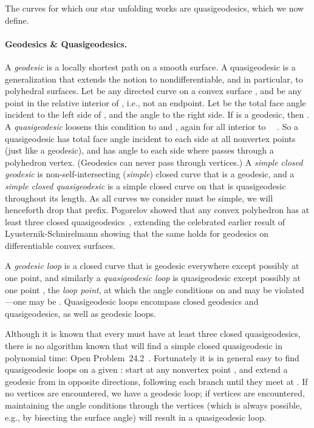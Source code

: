 \pdfoutput=1  \documentclass[]{article}
\begin{document}
The curves  for which our star unfolding works are
quasigeodesics, which we now define.



\paragraph{Geodesics \& Quasigeodesics.}
A \emph{geodesic} is a locally shortest path on a smooth surface.
A quasigeodesic is a generalization that extends the notion to 
nondifferentiable, and in particular, to
polyhedral surfaces.
Let  be any directed curve on a convex surface , 
and  be any point in the relative interior of , i.e., not
an endpoint.
Let  be the total face angle incident to the left side of ,
and  the angle to the right side.
If  is a geodesic, then .
A \emph{quasigeodesic}  loosens this condition to  and ,
again for all  interior to ~\cite[p.~16]{az-igs-67}~\cite[p.~28]{p-egcs-73}.
So a quasigeodesic  has  total face angle incident to each
side at all nonvertex points (just like a geodesic),
and has  angle to each side where  passes through a
polyhedron vertex.
(Geodesics can never pass through vertices.)
A \emph{simple closed geodesic} is non-self-intersecting (\emph{simple}) closed
curve that is a geodesic, and
a \emph{simple closed quasigeodesic} is a simple closed curve
on  that is quasigeodesic throughout its length.
As all curves we consider must be simple, we will henceforth
drop that prefix.
Pogorelov showed that any convex polyhedron  has at least three closed
quasigeodesics~\cite{p-qglcs-49}, extending the celebrated earlier result of
Lyusternik-Schnirelmann showing that the same holds for geodesics on 
differentiable convex surfaces.

A \emph{geodesic loop} is a closed curve that is geodesic
everywhere except possibly at one point,
and similarly a \emph{quasigeodesic loop} is quasigeodesic except
possibly at one point , the \emph{loop point}, at which the angle conditions
on  and  may be violated---one may be .
Quasigeodesic loops encompass
closed geodesics and quasigeodesics,
as well as geodesic loops.

Although it is known that every  must have at least
three closed quasigeodesics, 
there is no algorithm known that will find a simple closed quasigeodesic
in polynomial time:
Open Problem~24.2~\cite[p.~374]{do-gfalop-07}.
Fortunately it is in general
easy to find quasigeodesic loops on a given :
start at any nonvertex point , and extend a geodesic from
 in opposite directions, following each branch until they meet
at .  If no vertices are encountered, we have a geodesic loop;
if vertices are encountered, maintaining the angle conditions through the
vertices (which is always possible, e.g., by bisecting the surface angle) will
result in a quasigeodesic loop.
\end{document}
